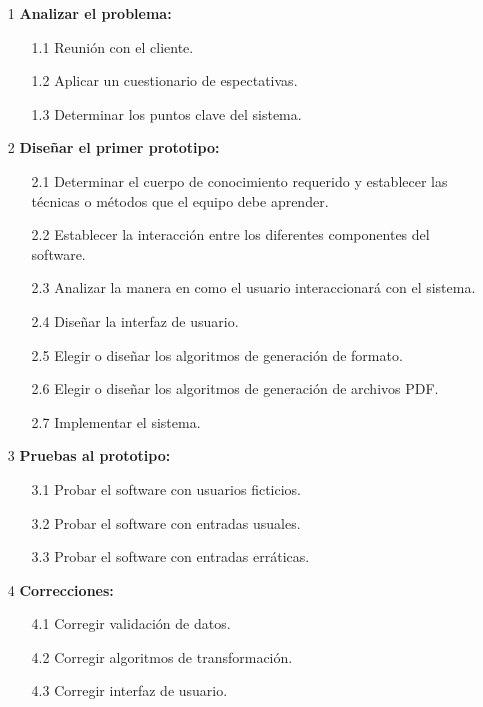 \documentclass[letterpaper]{article}
\begin{document}
\begin{enumerate}
\item[1] \textbf{Analizar el problema:}
  \begin{enumerate}
  \item[1.1] Reunión con el cliente.
  \item[1.2] Aplicar un cuestionario de espectativas.
  \item[1.3] Determinar los puntos clave del sistema.
  \end{enumerate}
\item[2] \textbf{Diseñar el primer prototipo:}
  \begin{enumerate}
  \item[2.1] Determinar el cuerpo de conocimiento requerido y establecer las técnicas o métodos que el equipo debe aprender.
  \item[2.2] Establecer la interacción entre los diferentes componentes del software.
  \item[2.3] Analizar la manera en como el usuario interaccionará con el sistema.
  \item[2.4] Diseñar la interfaz de usuario.
  \item[2.5] Elegir o diseñar los algoritmos de generación de formato.
  \item[2.6] Elegir o diseñar los algoritmos de generación de archivos PDF.
  \item[2.7] Implementar el sistema.
  \end{enumerate}
  
  \item[3] \textbf{Pruebas al prototipo:}
    \begin{enumerate}
    \item[3.1] Probar el software con usuarios ficticios.
    \item[3.2] Probar el software con entradas usuales.
    \item[3.3] Probar el software con entradas erráticas.
    \end{enumerate}
    
  \item[4] \textbf{Correcciones:}
    \begin{enumerate}
    \item[4.1] Corregir validación de datos.
    \item[4.2] Corregir algoritmos de transformación.
    \item[4.3] Corregir interfaz de usuario.
    \end{enumerate}
    

\end{enumerate}
\end{document}
